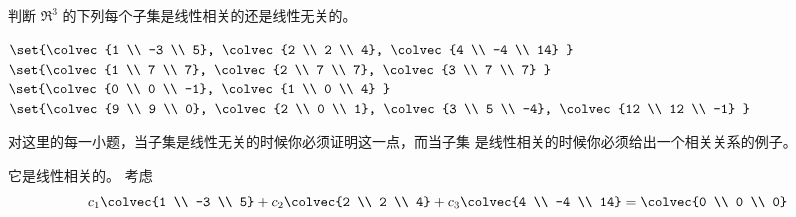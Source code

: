 \begin{exercises}
  \recommended \item
    判断 \( \Re^3 \) 的下列每个子集是线性相关的还是线性无关的。
    \begin{exparts*}
      \partsitem \( \set{\colvec{1 \\ -3 \\ 5},
                    \colvec{2 \\ 2 \\ 4},
                    \colvec{4 \\ -4 \\ 14} }  \)
      \partsitem \( \set{\colvec{1 \\ 7 \\ 7},
                    \colvec{2 \\ 7 \\ 7},
                    \colvec{3 \\ 7 \\ 7} }  \)
      \partsitem \( \set{\colvec{0 \\ 0 \\ -1},
                    \colvec{1 \\ 0 \\ 4} }  \)
      \partsitem \( \set{\colvec{9 \\ 9 \\ 0},
                    \colvec{2 \\ 0 \\ 1},
                    \colvec{3 \\ 5 \\ -4},
                    \colvec{12 \\ 12 \\ -1} }  \)
    \end{exparts*}
    \begin{answer}
      对这里的每一小题，当子集是线性无关的时候你必须证明这一点，而当子集
      是线性相关的时候你必须给出一个相关关系的例子。
      \begin{exparts}
        \partsitem 它是线性相关的。
          考虑
          \begin{equation*}
             c_1\colvec{1 \\ -3 \\ 5}
             +c_2\colvec{2 \\ 2 \\ 4}
             +c_3\colvec{4 \\ -4 \\ 14}
             =\colvec{0 \\ 0 \\ 0}

\end{equation*}
\end{exparts}
\end{answer}
\end{exercises}
